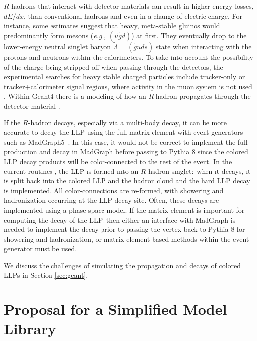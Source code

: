 $R$-hadrons that interact with detector materials can result in higher energy losses, $dE/dx$, than conventional hadrons and even in a change of electric charge.  For instance, some estimates \cite{Buccella:1985cs,Farrar:2010ps} suggest that heavy, meta-stable gluinos would predominantly form mesons (\emph{e.g.,}  $(u \tilde g \bar d)$) at first. They  eventually drop to the lower-energy neutral singlet baryon $\tilde \Lambda = (\tilde g u d s)$ state when interacting with the protons and neutrons within the calorimeters.  To take into account the possibility of the charge being stripped off when passing through the detectors, the experimental searches for heavy stable charged particles include tracker-only or tracker$+$calorimeter signal regions, where activity in the muon system is not used \cite{Aaboud:2016uth,CMS:2016ybj}.  Within Geant4 \cite{Agostinelli:2002hh} there is a modeling of how an $R$-hadron propagates through the detector material \cite{Mackeprang:2009ad}.  

If the $R$-hadron decays, especially via a multi-body decay, it can be more accurate to decay the LLP using the full matrix element with event generators such as MadGraph5~\cite{Alwall:2011uj,Alwall:2014hca}. In this case, it would not be correct to implement the full production and decay in MadGraph before passing to Pythia 8 since the colored LLP decay products will be color-connected to the rest of the event. In the current routines \cite{Sjostrand:2007gs,Sjostrand:2014zea}, the LLP is formed into an $R$-hadron singlet:~when it decays, it is split back into the colored LLP and the hadron cloud and the hard LLP decay is implemented. All color-connections are re-formed, with showering and hadronization occurring at the LLP decay site. Often, these decays are implemented using a phase-space model. If the matrix element is important for computing the decay of the LLP, then either an interface with MadGraph is needed to implement the decay prior to passing the vertex back to Pythia 8 for showering and hadronization, or matrix-element-based methods within the event generator must be used.

We discuss the challenges of simulating the propagation and decays of colored LLPs in Section \ref{sec:geant}.



\section{Proposal for a Simplified Model Library}\label{sec:library}


